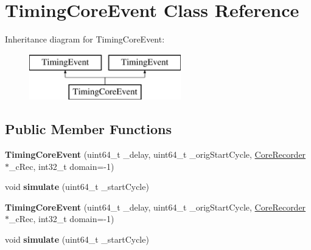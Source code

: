 \hypertarget{classTimingCoreEvent}{\section{Timing\-Core\-Event Class Reference}
\label{classTimingCoreEvent}
}
Inheritance diagram for Timing\-Core\-Event\-:\begin{figure}[H]
\begin{center}
\leavevmode
\includegraphics[height=2.000000cm]{classTimingCoreEvent}
\end{center}
\end{figure}
\subsection*{Public Member Functions}
\begin{DoxyCompactItemize}
\item 
\hypertarget{classTimingCoreEvent_a19cba8223db71910f8de5457594c3ccb}{{\bfseries Timing\-Core\-Event} (uint64\-\_\-t \-\_\-delay, uint64\-\_\-t \-\_\-orig\-Start\-Cycle, \hyperlink{classCoreRecorder}{Core\-Recorder} $\ast$\-\_\-c\-Rec, int32\-\_\-t domain=-\/1)}\label{classTimingCoreEvent_a19cba8223db71910f8de5457594c3ccb}

\item 
\hypertarget{classTimingCoreEvent_a0b4b3b3001aa807417ad96b858c73d27}{void {\bfseries simulate} (uint64\-\_\-t \-\_\-start\-Cycle)}\label{classTimingCoreEvent_a0b4b3b3001aa807417ad96b858c73d27}

\item 
\hypertarget{classTimingCoreEvent_a19cba8223db71910f8de5457594c3ccb}{{\bfseries Timing\-Core\-Event} (uint64\-\_\-t \-\_\-delay, uint64\-\_\-t \-\_\-orig\-Start\-Cycle, \hyperlink{classCoreRecorder}{Core\-Recorder} $\ast$\-\_\-c\-Rec, int32\-\_\-t domain=-\/1)}\label{classTimingCoreEvent_a19cba8223db71910f8de5457594c3ccb}

\item 
\hypertarget{classTimingCoreEvent_a0b4b3b3001aa807417ad96b858c73d27}{void {\bfseries simulate} (uint64\-\_\-t \-\_\-start\-Cycle)}\label{classTimingCoreEvent_a0b4b3b3001aa807417ad96b858c73d27}

\end{DoxyCompactItemize}
